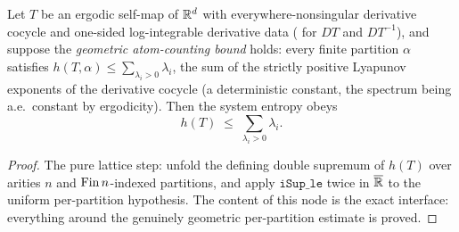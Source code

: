 \begin{theorem}\label{margulisRuelle_le_sumPosExp}
  \leanok
  Let \(T\) be an ergodic self-map of \(\mathbb{R}^d\) with everywhere-nonsingular derivative cocycle and
  one-sided log-integrable derivative data ( for \(DT\) and \(DT^{-1}\)),
  and suppose the \emph{geometric atom-counting bound} holds: every finite partition \(\alpha\)
  satisfies \(h(T,\alpha)\le\sum_{\lambda_i>0}\lambda_i\), the sum of the strictly positive
  Lyapunov exponents of the derivative cocycle (a deterministic constant, the spectrum being
  a.e.\ constant by ergodicity). Then the system entropy obeys
  \[
    h(T) \;\le\; \sum_{\lambda_i>0}\lambda_i.
  \]
\end{theorem}
\begin{proof}\leanok
  The pure lattice step: unfold the defining double supremum of \(h(T)\) over arities \(n\) and
  \(\operatorname{Fin} n\)-indexed partitions, and apply \(\texttt{iSup\_le}\) twice in \(\overline{\mathbb{R}}\) to the
  uniform per-partition hypothesis. The content of this node is the exact interface: everything
  around the genuinely geometric per-partition estimate is proved.
\end{proof}


